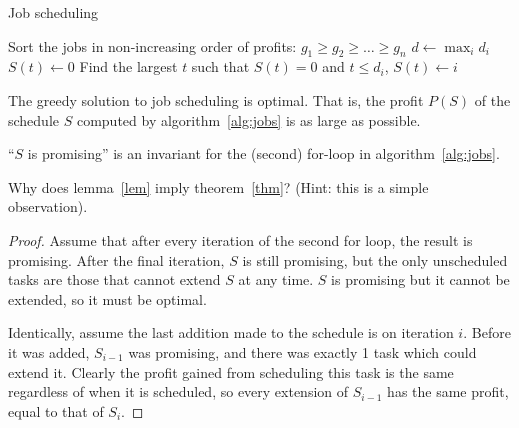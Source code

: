 \documentclass{article}
\newenvironment{thm}[1]
	{\renewcommand\theinnerthm{#1}\innerthm}
	{\endinnerthm}
\newenvironment{lem}[1]
	{\renewcommand\theinnerlem{#1}\innerlem}
	{\endinnerlem}
\newenvironment{prb}[1]
	{\renewcommand\theinnerprb{#1}\innerprb}
	{\endinnerprb}
\begin{document}
\begin{algorithm}
\caption{Job scheduling}%
\label{alg:jobs}%
\begin{algorithmic}[1]
\STATE Sort the jobs in non-increasing order of profits:
  $g_1\geq g_2\geq\ldots\geq g_n$ 
\STATE $d\longleftarrow\max_id_i$ 
     \STATE $S(t)\longleftarrow 0$ 
\ENDFOR
{} 
     \STATE Find the largest $t$ such that $S(t)=0$ and $t\leq d_i$,
            $S(t)\longleftarrow i$
\ENDFOR
\end{algorithmic}
\end{algorithm}

\begin{thm}{2.18}\label{thm}
The greedy solution to job scheduling is optimal. That is, the profit $P(S)$ of the schedule $S$ computed
by algorithm~\ref{alg:jobs} is as large as possible.
\end{thm}

\begin{lem}{2.19}\label{lem}
``$S$ is promising'' is an invariant for the (second) for-loop
in algorithm~\ref{alg:jobs}.   
\end{lem}

\begin{prb}{2.21}
Why does lemma~\ref{lem} imply theorem~\ref{thm}?
(Hint: this is a simple observation). 
\end{prb}

\begin{proof}
Assume that after every iteration of the second for loop, the 
result is promising. After the final iteration, $S$ is still
promising, but the only unscheduled tasks are those that 
cannot extend $S$ at any time. $S$ is 
promising but it cannot be extended, so it must be optimal.

Identically, assume the last addition made to the schedule is on iteration
$i$. Before it was added,
$S_{i-1}$ was promising, and there was exactly 1 task which could extend
it. Clearly the profit gained from scheduling this task is the same
regardless of when it is scheduled, so every extension of $S_{i-1}$ has
the same profit, equal to that of $S_i$.
\end{proof}
\end{document}
